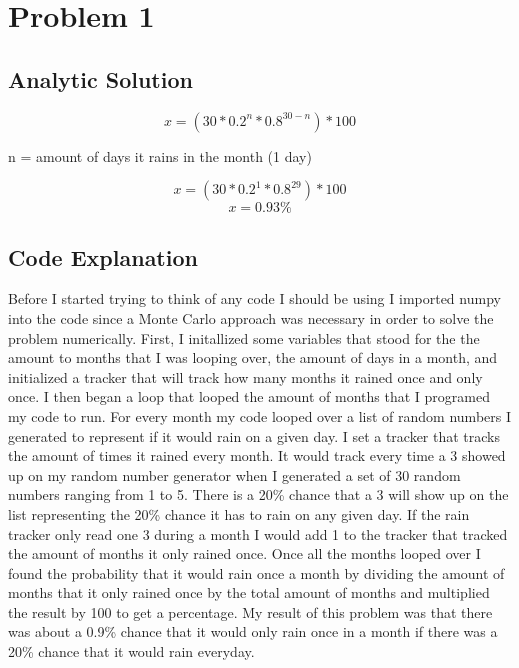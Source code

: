 \documentclass[12pt]{article}
\begin{document}
\section{Problem 1}
\subsection{Analytic Solution}
$$ x = (30*0.2^n*0.8^{30-n})*100$$
\begin{center}
n = amount of days it rains in the month (1 day)
\end{center}
$$ x = (30*0.2^1*0.8^{29})*100$$
$$ x = 0.93\%$$
\subsection{Code Explanation}
Before I started trying to think of any code I should be using I imported numpy into the code since a Monte Carlo approach was necessary in order to solve the problem numerically. First, I initallized some variables that stood for the the amount to months that I was looping over, the amount of days in a month, and initialized a tracker that will track how many months it rained once and only once. I then began a loop that looped the amount of months that I programed my code to run. For every month my code looped over a list of random numbers I generated to represent if it would rain on a given day. I set a tracker that tracks the amount of times it rained every month. It would track every time a 3 showed up on my random number generator when I generated a set of 30 random numbers ranging from 1 to 5. There is a 20\% chance that a 3 will show up on the list representing the 20\% chance it has to rain on any given day. If the rain tracker only read one 3 during a month I would add 1 to the tracker that tracked the amount of months it only rained once. Once all the months looped over I found the probability that it would rain once a month by dividing the amount of months that it only rained once by the total amount of months and multiplied the result by 100 to get a percentage. My result of this problem was that there was about a 0.9\% chance that it would only rain once in a month if there was a 20\% chance that it would rain everyday.
\end{document}

